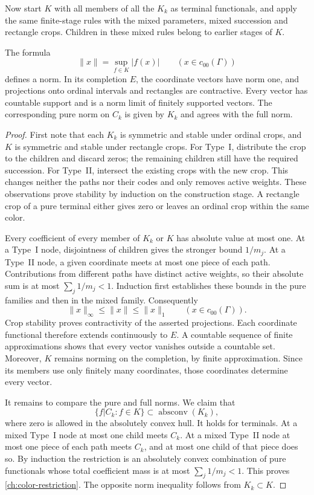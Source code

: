 Now start $K$ with all members of all the $K_k$ as terminal functionals,
and apply the same finite-stage rules with the mixed parameters,
mixed succession and rectangle crops.  Children in these mixed rules
belong to earlier stages of $K$.

\begin{lemma}\label{ch:norm}
The formula
\[
 \|x\|=\sup_{f\in K}|f(x)|\qquad(x\in c_{00}(\Gamma))
\]
defines a norm.  In its completion $E$, the coordinate vectors have norm
one, and projections onto ordinal intervals and rectangles are
contractive.  Every vector has countable support and is a norm limit of
finitely supported vectors.  The corresponding pure norm on $C_k$ is
given by $K_k$ and agrees with the full norm.
\end{lemma}

\begin{proof}
First note that each $K_k$ is symmetric and stable under ordinal crops,
and $K$ is symmetric and stable under rectangle crops.  For Type~I,
distribute the crop to the children and discard zeros; the remaining
children still have the required succession.  For Type~II, intersect
the existing crops with the new crop.  This changes neither the paths
nor their codes and only removes active weights.  These observations
prove stability by induction on the construction stage.  A rectangle
crop of a pure terminal either gives zero or leaves an ordinal crop
within the same color.

Every coefficient of every member of $K_k$ or $K$ has absolute value
at most one.  At a Type~I node, disjointness of children gives the
stronger bound $1/m_j$.  At a Type~II node, a given coordinate meets at
most one piece of each path.  Contributions from different paths have
distinct active weights, so their absolute sum is at most
$\sum_j1/m_j<1$.  Induction first establishes these bounds in the pure
families and then in the mixed family.  Consequently
\[
 \|x\|_\infty\le\|x\|\le\|x\|_1
 \qquad(x\in c_{00}(\Gamma)).
\]
Crop stability proves contractivity of the asserted projections.  Each
coordinate functional therefore extends continuously to $E$.  A
countable sequence of finite approximations shows that every vector
vanishes outside a countable set.  Moreover, $K$ remains norming on the
completion, by finite approximation.  Since its members use only
finitely many coordinates, those coordinates determine every vector.

It remains to compare the pure and full norms.  We claim that
\begin{equation}
 \{f|C_k:f\in K\}\subset\operatorname{absconv}(K_k),
 \label{ch:color-restriction}
\end{equation}
where zero is allowed in the absolutely convex hull.  It holds for
terminals.  At a mixed Type~I node at most one child meets $C_k$.
At a mixed Type~II node at most one piece of each path meets $C_k$,
and at most one child of that piece does so.  By induction the
restriction is an absolutely convex combination of pure functionals
whose total coefficient mass is at most
$\sum_j1/m_j<1$.  This proves \eqref{ch:color-restriction}.  The opposite
norm inequality follows from $K_k\subset K$.
\end{proof}

